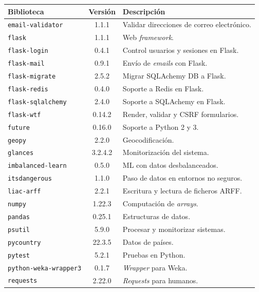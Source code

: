 \begin{table}[p]
\centering
\begin{tabular}{lcl}
	\toprule
	\textbf{Biblioteca} & \textbf{Versión} & \textbf{Descripción}\\
	\midrule
	\rowcolor[HTML]{EFEFEF} 
	\texttt{email-validator} & 1.1.1 & Validar direcciones de correo electrónico.\\
	\texttt{flask} & 1.1.1 & Web \textit{framework}.\\ \rowcolor[HTML]{EFEFEF}
	\texttt{flask-login} & 0.4.1 & Control usuarios y sesiones en Flask.\\
	\texttt{flask-mail} & 0.9.1 & Envío de \textit{emails} con Flask.\\ \rowcolor[HTML]{EFEFEF}
	\texttt{flask-migrate} & 2.5.2 & Migrar SQLAchemy DB a Flask.\\
	\texttt{flask-redis} & 0.4.0 & Soporte a Redis en Flask.\\ \rowcolor[HTML]{EFEFEF}
	\texttt{flask-sqlalchemy} & 2.4.0 & Soporte a SQLAchemy en Flask.\\
	\texttt{flask-wtf} & 0.14.2 & Render, validar y CSRF formularios.\\ \rowcolor[HTML]{EFEFEF}
	\texttt{future} & 0.16.0 & Soporte a Python 2 y 3.\\ 
	\texttt{geopy} & 2.2.0 & Geocodificación.\\ \rowcolor[HTML]{EFEFEF}
	\texttt{glances} & 3.2.4.2 & Monitorización del sistema.\\ 
	\texttt{imbalanced-learn} & 0.5.0 & ML con datos desbalanceados.\\ \rowcolor[HTML]{EFEFEF}
	\texttt{itsdangerous} & 1.1.0 & Paso de datos en entornos no seguros.\\
	\texttt{liac-arff} & 2.2.1 & Escritura y lectura de ficheros ARFF.\\ \rowcolor[HTML]{EFEFEF}
	\texttt{numpy} & 1.22.3 & Computación de \textit{arrays}.\\
	\texttt{pandas} & 0.25.1 & Estructuras de datos.\\ \rowcolor[HTML]{EFEFEF}
	\texttt{psutil} & 5.9.0 & Procesar y monitorizar sistemas.\\
	\texttt{pycountry} & 22.3.5 & Datos de países.\\ \rowcolor[HTML]{EFEFEF}
	\texttt{pytest} & 5.2.1 & Pruebas en Python.\\
	\texttt{python-weka-wrapper3} & 0.1.7 & \textit{Wrapper} para Weka.\\ \rowcolor[HTML]{EFEFEF}
	\texttt{requests} & 2.22.0 & \textit{Requests} para humanos.\\

\end{tabular}
\end{table}
